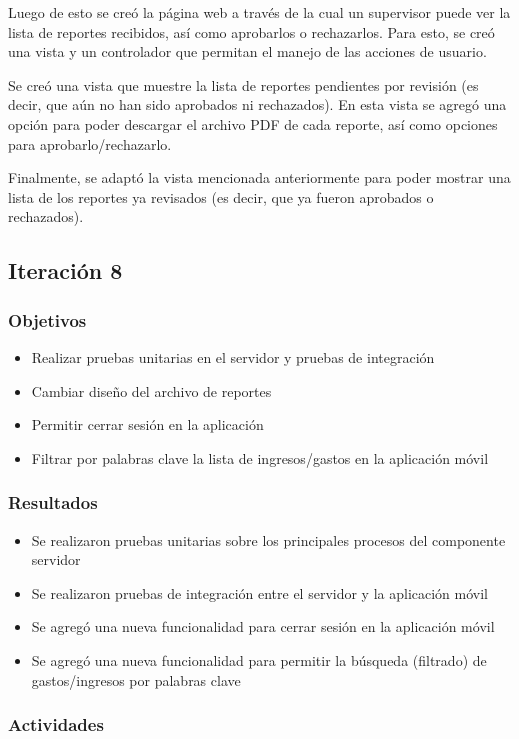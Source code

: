 Luego de esto se creó la página web a través de la cual un supervisor puede ver la lista de reportes recibidos, así como aprobarlos o rechazarlos. Para esto, se creó una vista y un controlador que permitan el manejo de las acciones de usuario.

Se creó una vista que muestre la lista de reportes pendientes por revisión (es decir, que aún no han sido aprobados ni rechazados). En esta vista se agregó una opción para poder descargar el archivo PDF de cada reporte, así como opciones para aprobarlo/rechazarlo.

Finalmente, se adaptó la vista mencionada anteriormente para poder mostrar una lista de los reportes ya revisados (es decir, que ya fueron aprobados o rechazados).

\subsection{Iteración 8}

\subsubsection{Objetivos}
\begin{itemize}
\item Realizar pruebas unitarias en el servidor y pruebas de integración
\item Cambiar diseño del archivo de reportes
\item Permitir cerrar sesión en la aplicación
\item Filtrar por palabras clave la lista de ingresos/gastos en la aplicación móvil
\end{itemize}
\subsubsection{Resultados}
\begin{itemize}
\item Se realizaron pruebas unitarias sobre los principales procesos del componente servidor
\item Se realizaron pruebas de integración entre el servidor y la aplicación móvil
\item Se agregó una nueva funcionalidad para cerrar sesión en la aplicación móvil
\item Se agregó una nueva funcionalidad para permitir la búsqueda (filtrado) de gastos/ingresos por palabras clave
\end{itemize}

\subsubsection{Actividades}
